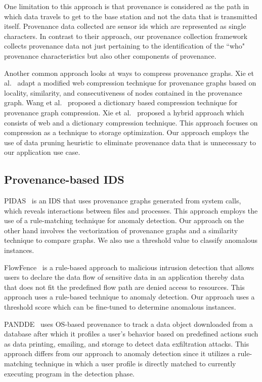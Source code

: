  One limitation to this approach is that provenance is considered as the path in which data travels to get to the base station and not the data that is transmitted itself. Provenance data collected are sensor ids which are represented as single characters. In contrast to their approach, our provenance collection framework collects provenance data not just pertaining to the identification of the ``who" provenance characteristics but also other components of provenance. 
 
 Another common approach looks at ways to compress provenance graphs. Xie et al.~\cite{xie11-tapp}  adapt a modified web compression technique for provenance graphs based on locality, similarity, and consecutiveness of nodes contained in the provenance graph.  Wang et al.~\cite{7038199} proposed a dictionary based compression technique for provenance graph compression.  Xie et al.~\cite{Xie:2012:HAE:2396761.2398511} proposed a hybrid approach which consists of web and a dictionary compression technique. This approach focuses on compression as a technique to storage optimization. Our approach employs the use of data pruning heuristic  to eliminate provenance data that is unnecessary to our application use case. 
 
 
 
 \subsection{Provenance-based IDS}
 
PIDAS~\cite{Xie:2016:UID:2936026.2936232} is an IDS that uses provenance graphs generated from system calls, which reveals interactions between files and processes. This approach employs the use of a rule-matching technique for anomaly detection. Our approach on the other hand involves the vectorization of provenance graphs and a similarity technique to compare graphs. We also use a threshold value to classify anomalous instances. 

FlowFence~\cite{197137} is a rule-based approach to malicious intrusion detection that allows users to declare the data flow of sensitive data in an application thereby data that does not fit the predefined flow path are denied access to resources.  This approach uses a rule-based technique to anomaly detection. Our approach uses a threshold score which can be fine-tuned to determine anomalous instances. 

PANDDE~\cite{Fadolalkarim} uses OS-based provenance to track a data object downloaded from a database after which it profiles a user's behavior based on predefined actions such as data printing, emailing, and storage to detect data exfiltration attacks. This approach differs from our approach to anomaly detection since it utilizes a rule-matching technique in which a user profile is directly matched to currently executing program in the detection phase. 

